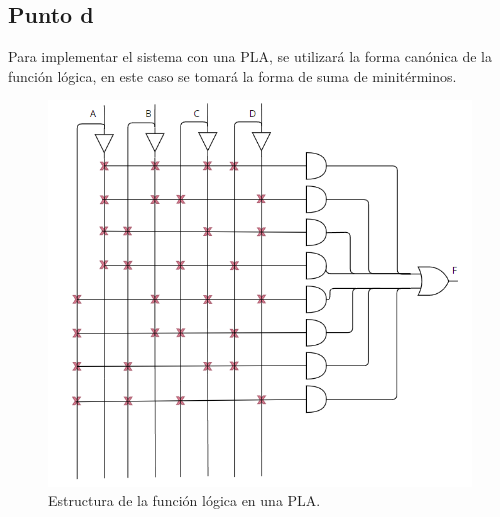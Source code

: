 \documentclass{article}
\begin{document}
\subsection*{Punto d}
Para implementar el sistema con una PLA, se utilizará la forma canónica de la función lógica, en este caso se tomará la forma de suma de minitérminos.

\begin{figure}[h]
    \centering
    \includegraphics[scale=0.8]{plaej.png}
    \caption{Estructura de la función lógica en una PLA.}
\end{figure}
\end{document}
